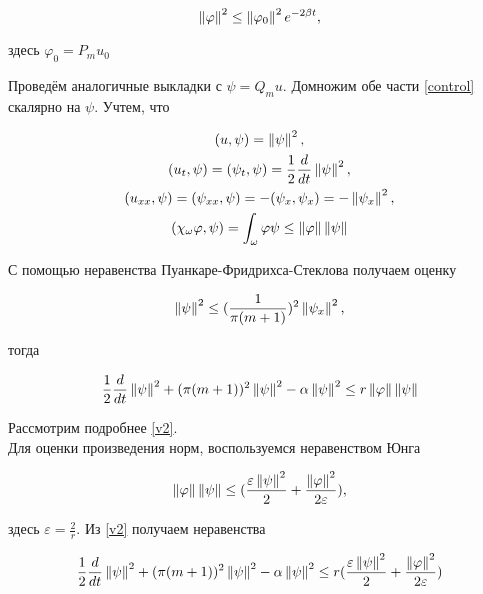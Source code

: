 \begin{equation}\label{phi_mark}
    \left\lVert\varphi\right\rVert^2 \le \left\lVert\varphi_0\right\rVert^2 e^{-2\beta t},
\end{equation}

здесь $\varphi_0 = P_m u_0$
\vspace{2em}

Проведём аналогичные выкладки с $\psi = Q_m u$. Домножим обе части 
\eqref{control} скалярно на $\psi$. Учтем, что

\begin{gather*}
    (u, \psi) = \left\lVert\psi\right\rVert^2,\\*
    (u_t, \psi) = (\psi_t, \psi) = \frac{1}{2} \frac{d}{dt} \left\lVert\psi\right\rVert^2,\\*
    (u_{xx}, \psi) = (\psi_{xx}, \psi) = -(\psi_x, \psi_x) = -
    \left\lVert\psi_x\right\rVert^2,\\*
    (\chi_{\omega}\varphi, \psi) = \int_{\omega}{\varphi \psi} \le
    \left\lVert\varphi\right\rVert \left\lVert\psi\right\rVert
\end{gather*}

С помощью неравенства Пуанкаре-Фридрихса-Стеклова получаем оценку

\begin{equation}
    \left\lVert\psi\right\rVert^2 \le (\frac{1}{\pi(m + 1)})^2 \left\lVert\psi_x\right\rVert^2,
\end{equation}

тогда

\begin{equation}\label{v2}
    \frac{1}{2} \frac{d}{dt} \left\lVert\psi\right\rVert^2 + (\pi(m + 1))^2 \left\lVert\psi\right\rVert^2 - 
    \alpha \left\lVert\psi\right\rVert^2 \le r \left\lVert\varphi\right\rVert \left\lVert\psi\right\rVert
\end{equation}

Рассмотрим подробнее \eqref{v2}.\\
Для оценки произведения норм, воспользуемся неравенством Юнга

\begin{equation*}
    \left\lVert\varphi\right\rVert \left\lVert\psi\right\rVert \le (\frac{\varepsilon \left\lVert\psi\right\rVert^2}{2} + 
    \frac{\left\lVert\varphi\right\rVert^2}{2 \varepsilon}),
\end{equation*}

здесь $\varepsilon = \frac{2}{r}$. Из \eqref{v2} получаем неравенства

\begin{equation*}
    \frac{1}{2} \frac{d}{dt} \left\lVert\psi\right\rVert^2 + (\pi(m + 1))^2 \left\lVert\psi\right\rVert^2 - 
    \alpha \left\lVert\psi\right\rVert^2 \le r (\frac{\varepsilon \left\lVert\psi\right\rVert^2}{2} + 
    \frac{\left\lVert\varphi\right\rVert^2}{2 \varepsilon})
\end{equation*}

